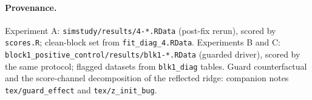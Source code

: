 \documentclass[11pt]{article}
\newcommand{\code}[1]{\texttt{#1}}
\begin{document}
\paragraph{Provenance.} Experiment A: \code{simstudy/results/4-*.RData}
(post-fix rerun), scored by \code{scores.R}; clean-block set from
\code{fit\_diag\_4.RData}. Experiments B and C:
\code{block1\_positive\_control/results/blk1-*.RData} (guarded driver),
scored by the same protocol; flagged datasets from \code{blk1\_diag} tables.
Guard counterfactual and the score-channel decomposition of the reflected
ridge: companion notes \code{tex/guard\_effect} and \code{tex/z\_init\_bug}.
\end{document}
